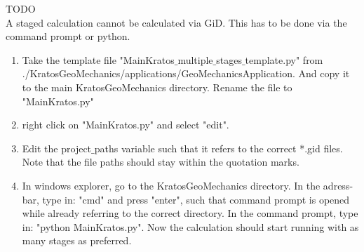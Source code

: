 

TODO \\

A staged calculation cannot be calculated via GiD. This has to be done via the command prompt or python.
\begin{enumerate}[resume]
	\item Take the template file "MainKratos$\_$multiple$\_$stages$\_$template.py" from ./KratosGeoMechanics/applications/GeoMechanicsApplication. And copy it to the main KratosGeoMechanics directory. Rename the file to "MainKratos.py"
	
	\item right click on "MainKratos.py" and select "edit". 
	\item Edit the project$\_$paths variable such that it refers to the correct *.gid files. Note that the file paths should stay within the quotation marks.
	
	\item In windows explorer, go to the KratosGeoMechanics directory. In the adress-bar, type in: "cmd" and press "enter", such that command prompt is opened while already referring to the correct directory. In the command prompt, type in: "python MainKratos.py". Now the calculation should start running with as many stages as preferred. 
	
\end{enumerate}